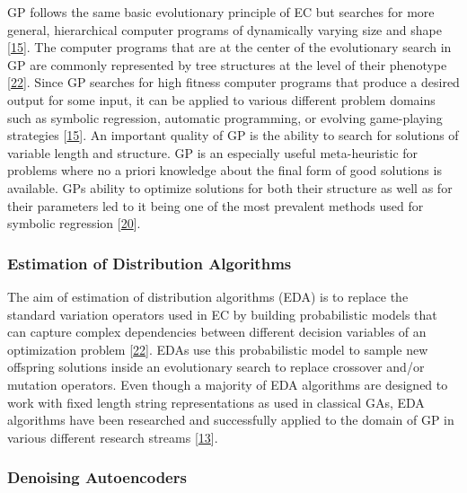 \documentclass[
  11pt,
]{article}
\begin{document}
GP follows the same basic evolutionary principle of EC but searches for more general, hierarchical computer programs of dynamically varying size and shape {[}\protect\hyperlink{ref-Koza1993GeneticP}{15}{]}.
The computer programs that are at the center of the evolutionary search in GP are commonly represented by tree structures at the level of their phenotype {[}\protect\hyperlink{ref-design_of_modern_heuristics}{22}{]}.
Since GP searches for high fitness computer programs that produce a desired output for some input, it can be applied to various different problem domains such as symbolic regression, automatic programming, or evolving game-playing strategies {[}\protect\hyperlink{ref-Koza1993GeneticP}{15}{]}.
An important quality of GP is the ability to search for solutions of variable length and structure.
GP is an especially useful meta-heuristic for problems where no a priori knowledge about the final form of good solutions is available.
GPs ability to optimize solutions for both their structure as well as for their parameters led to it being one of the most prevalent methods used for symbolic regression {[}\protect\hyperlink{ref-10.1007ux2f978-3-540-24621-3_22}{20}{]}.

\hypertarget{estimation-of-distribution-algorithms}{%
\subsubsection{Estimation of Distribution Algorithms}\label{estimation-of-distribution-algorithms}}

The aim of estimation of distribution algorithms (EDA) is to replace the standard variation operators used in EC by building probabilistic models that can capture complex dependencies between different decision variables of an optimization problem {[}\protect\hyperlink{ref-design_of_modern_heuristics}{22}{]}.
EDAs use this probabilistic model to sample new offspring solutions inside an evolutionary search to replace crossover and/or mutation operators.
Even though a majority of EDA algorithms are designed to work with fixed length string representations as used in classical GAs, EDA algorithms have been researched and successfully applied to the domain of GP in various different research streams {[}\protect\hyperlink{ref-kim_probMod_GP}{13}{]}.

\hypertarget{denoising-autoencoders}{%
\subsubsection{Denoising Autoencoders}\label{denoising-autoencoders}}
\end{document}
